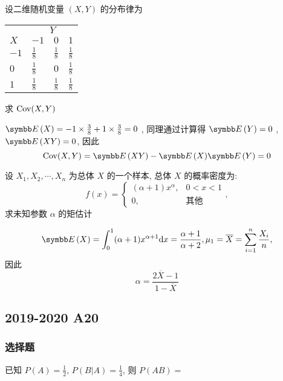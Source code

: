 \begin{ti}[$8$ 分]
	设二维随机变量 $(X,Y)$ 的分布律为
	\begin{center}
		\begin{tabularx}{0.8\textwidth}{ZZZZ}
			\hline
			 & \\
			$X$ & $-1$ & $0$ & $1$\\
			\hline
			$-1$ & $\frac{1}{8}$ & $\frac{1}{8}$ & $\frac{1}{8}$\\
			$0$ & $\frac{1}{8}$ & $0$ & $\frac{1}{8}$\\
			$1$ & $\frac{1}{8}$ & $\frac{1}{8}$ & $\frac{1}{8}$\\
			\hline
		\end{tabularx}
	\end{center}
	求 $\operatorname{Cov}(X,Y)$
	\begin{solution}
		$\EE(X)=-1\times\frac{3}{8}+1\times\frac{3}{8}=0$ , 同理通过计算得 $\EE(Y)=0$ , $\EE(XY)=0$, 因此
		\[
			\Cov(X,Y)=\EE(XY)-\EE(X)\EE(Y)=0
		\]
	\end{solution}
\end{ti}

\begin{ti}[$10$ 分]
	设 $X_1,X_2,\cdots,X_n$ 为总体 $X$ 的一个样本, 总体 $X$ 的概率密度为:
	\begin{equation*}
		f(x)=
		\begin{cases}
		(\alpha+1)x^\alpha, & 0<x<1\\
		0, & \text{其他}
		\end{cases},
	\end{equation*}
	求未知参数 $\alpha$ 的矩估计
	\begin{solution}
		\[
			\EE(X)=\int_{0}^{1}(\alpha+1)x^{\alpha+1}\dd x=\frac{\alpha+1}{\alpha+2}, \mu_1=\overline{X}=\sum_{i=1}^{n}\frac{X_i}{n},
		\]
		因此
		\[
			\alpha=\frac{2\overline{X}-1}{1-\overline{X}}
		\]
	\end{solution}
\end{ti}

\subsection{2019-2020 A20}
\subsubsection{选择题}
\begin{ti}
	已知 $P(A) = \frac{1}{2}$, $P(B|A) = \frac{1}{4}$, 则 $P(AB) = $ \kuo
\end{ti}

